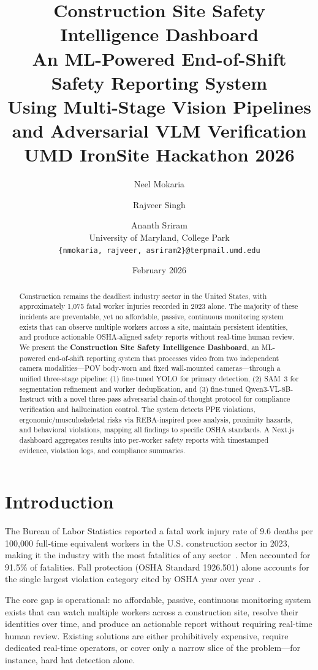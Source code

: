 \documentclass[11pt, twocolumn]{article}
\title{
\textbf{Construction Site Safety Intelligence Dashboard} \\[6pt]
\large An ML-Powered End-of-Shift Safety Reporting System \\
Using Multi-Stage Vision Pipelines and Adversarial VLM Verification \\[6pt]
\normalsize UMD IronSite Hackathon 2026
}
\author{
Neel Mokaria \and Rajveer Singh \and Ananth Sriram \\[4pt]
\normalsize University of Maryland, College Park \\
\normalsize \texttt{\{nmokaria, rajveer, asriram2\}@terpmail.umd.edu}
}
\date{February 2026}
\begin{document}
\maketitle

\begin{abstract}
Construction remains the deadliest industry sector in the United States, with approximately 1,075 fatal worker injuries recorded in 2023 alone. The majority of these incidents are preventable, yet no affordable, passive, continuous monitoring system exists that can observe multiple workers across a site, maintain persistent identities, and produce actionable OSHA-aligned safety reports without real-time human review. We present the \textbf{Construction Site Safety Intelligence Dashboard}, an ML-powered end-of-shift reporting system that processes video from two independent camera modalities---POV body-worn and fixed wall-mounted cameras---through a unified three-stage pipeline: (1) fine-tuned YOLO for primary detection, (2) SAM~3 for segmentation refinement and worker deduplication, and (3) fine-tuned Qwen3-VL-8B-Instruct with a novel three-pass adversarial chain-of-thought protocol for compliance verification and hallucination control. The system detects PPE violations, ergonomic/musculoskeletal risks via REBA-inspired pose analysis, proximity hazards, and behavioral violations, mapping all findings to specific OSHA standards. A Next.js dashboard aggregates results into per-worker safety reports with timestamped evidence, violation logs, and compliance summaries.
\end{abstract}

\section{Introduction}

The Bureau of Labor Statistics reported a fatal work injury rate of 9.6 deaths per 100,000 full-time equivalent workers in the U.S. construction sector in 2023, making it the industry with the most fatalities of any sector~\cite{bls2023}. Men accounted for 91.5\% of fatalities. Fall protection (OSHA Standard 1926.501) alone accounts for the single largest violation category cited by OSHA year over year~\cite{osha2024}.

The core gap is operational: no affordable, passive, continuous monitoring system exists that can watch multiple workers across a construction site, resolve their identities over time, and produce an actionable report without requiring real-time human review. Existing solutions are either prohibitively expensive, require dedicated real-time operators, or cover only a narrow slice of the problem---for instance, hard hat detection alone.
\end{document}

